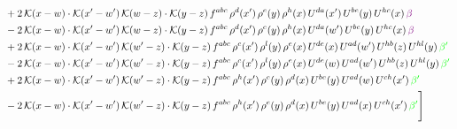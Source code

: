 \documentclass[9pt]{article}
\numberwithin{equation}{section}
\begin{document}
\begin{align}
& +2\,\mathcal{K}(x-w)\cdot \mathcal{K}(x'-w')\, \mathcal{K}(w-z)\cdot \mathcal{K}(y-z)\, f^{abc}\,\rho^{d}(x')\,\rho^{e}(y)\,\rho^{h}(x)\, U^{da}(x')\,U^{be}(y)\,U^{hc}(x)\,{\color{violet} \beta}\notag\\
& -2\,\mathcal{K}(x-w)\cdot \mathcal{K}(x'-w')\, \mathcal{K}(w-z)\cdot \mathcal{K}(y-z)\, f^{abc}\,\rho^{d}(x')\,\rho^{e}(y)\,\rho^{h}(x)\, U^{da}(w')\,U^{be}(y)\,U^{hc}(x)\,{\color{violet} \beta}\notag\\
&+2\,\mathcal{K}(x-w)\cdot\mathcal{K}(x'-w')\,\mathcal{K}(w'-z)\cdot\mathcal{K}(y-z)\, f^{abc}\,\rho^{c}(x')\,\rho^{l}(y)\,\rho^{e}(x)\,U^{de}(x)\,U^{ad}(w')\,U^{hb}(z)\,U^{hl}(y)\,{\color{green} \beta'}\notag \\ &-2\,\mathcal{K}(x-w)\cdot\mathcal{K}(x'-w')\,\mathcal{K}(w'-z)\cdot\mathcal{K}(y-z)\, f^{abc}\,\rho^{c}(x')\,\rho^{l}(y)\,\rho^{e}(x)\,U^{de}(w)\,U^{ad}(w')\,U^{hb}(z)\,U^{hl}(y)\,{\color{green} \beta'}\notag \\ & +2\,\mathcal{K}(x-w)\cdot\mathcal{K}(x'-w')\,\mathcal{K}(w'-z)\cdot\mathcal{K}(y-z)\, f^{abc}\,\rho^{h}(x')\,\rho^{e}(y)\,\rho^{d}(x)\,U^{be}(y)\,U^{ad}(w)\,U^{ch}(x')\,{\color{green} \beta'} \notag\\ & -2\,\mathcal{K}(x-w)\cdot\mathcal{K}(x'-w')\,\mathcal{K}(w'-z)\cdot\mathcal{K}(y-z)\, f^{abc}\,\rho^{h}(x')\,\rho^{e}(y)\,\rho^{d}(x)\,U^{be}(y)\,U^{ad}(x)\,U^{ch}(x')\,{\color{green} \beta'} \Bigg]
\end{align}
\end{document}
